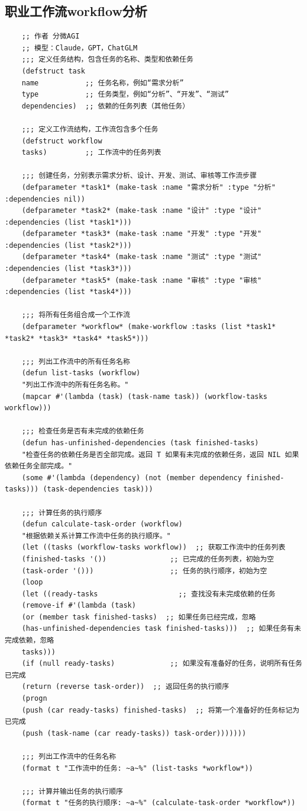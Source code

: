 \documentclass[12pt]{book}
\begin{document}
\subsection{职业工作流workflow分析}
	\begin{lstlisting}
	;; 作者 分微AGI
	;; 模型：Claude，GPT，ChatGLM
	;;; 定义任务结构，包含任务的名称、类型和依赖任务
	(defstruct task
	name           ;; 任务名称，例如“需求分析”
	type           ;; 任务类型，例如“分析”、“开发”、“测试”
	dependencies)  ;; 依赖的任务列表（其他任务）
	
	;;; 定义工作流结构，工作流包含多个任务
	(defstruct workflow
	tasks)         ;; 工作流中的任务列表
	
	;;; 创建任务，分别表示需求分析、设计、开发、测试、审核等工作流步骤
	(defparameter *task1* (make-task :name "需求分析" :type "分析" :dependencies nil))
	(defparameter *task2* (make-task :name "设计" :type "设计" :dependencies (list *task1*)))
	(defparameter *task3* (make-task :name "开发" :type "开发" :dependencies (list *task2*)))
	(defparameter *task4* (make-task :name "测试" :type "测试" :dependencies (list *task3*)))
	(defparameter *task5* (make-task :name "审核" :type "审核" :dependencies (list *task4*)))
	
	;;; 将所有任务组合成一个工作流
	(defparameter *workflow* (make-workflow :tasks (list *task1* *task2* *task3* *task4* *task5*)))
	
	;;; 列出工作流中的所有任务名称
	(defun list-tasks (workflow)
	"列出工作流中的所有任务名称。"
	(mapcar #'(lambda (task) (task-name task)) (workflow-tasks workflow)))
	
	;;; 检查任务是否有未完成的依赖任务
	(defun has-unfinished-dependencies (task finished-tasks)
	"检查任务的依赖任务是否全部完成。返回 T 如果有未完成的依赖任务，返回 NIL 如果依赖任务全部完成。"
	(some #'(lambda (dependency) (not (member dependency finished-tasks))) (task-dependencies task)))
	
	;;; 计算任务的执行顺序
	(defun calculate-task-order (workflow)
	"根据依赖关系计算工作流中任务的执行顺序。"
	(let ((tasks (workflow-tasks workflow))  ;; 获取工作流中的任务列表
	(finished-tasks '())               ;; 已完成的任务列表，初始为空
	(task-order '()))                  ;; 任务的执行顺序，初始为空
	(loop
	(let ((ready-tasks                   ;; 查找没有未完成依赖的任务
	(remove-if #'(lambda (task)
	(or (member task finished-tasks)  ;; 如果任务已经完成，忽略
	(has-unfinished-dependencies task finished-tasks)))  ;; 如果任务有未完成依赖，忽略
	tasks)))
	(if (null ready-tasks)             ;; 如果没有准备好的任务，说明所有任务已完成
	(return (reverse task-order))  ;; 返回任务的执行顺序
	(progn
	(push (car ready-tasks) finished-tasks)  ;; 将第一个准备好的任务标记为已完成
	(push (task-name (car ready-tasks)) task-order)))))))
	
	;;; 列出工作流中的任务名称
	(format t "工作流中的任务: ~a~%" (list-tasks *workflow*))
	
	;;; 计算并输出任务的执行顺序
	(format t "任务的执行顺序: ~a~%" (calculate-task-order *workflow*))
\end{lstlisting}
\end{document}
